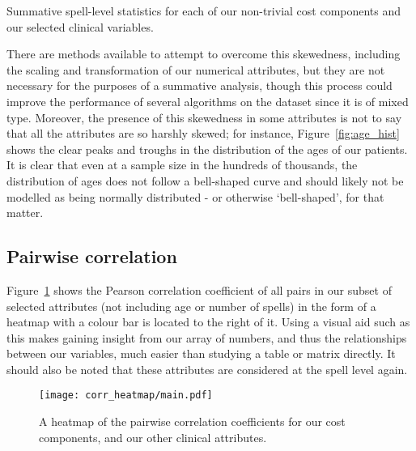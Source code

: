 \begin{table}[h!]
    \resizebox{\textwidth}{!}{%
        
    }
    \resizebox{\textwidth}{!}{%
        
    }
    \resizebox{\textwidth}{!}{%
        
    }
    \caption{Summative spell-level statistics for each of our non-trivial cost
    components and our selected clinical variables.}\label{tab:summative}
\end{table}

There are methods available to attempt to overcome this skewedness, including
the scaling and transformation of our numerical attributes, but they are not
necessary for the purposes of a summative analysis, though this process could
improve the performance of several algorithms on the dataset since it is of
mixed type. Moreover, the presence of this skewedness in some attributes is not
to say that all the attributes are so harshly skewed; for instance,
Figure~\ref{fig:age_hist} shows the clear peaks and troughs in the distribution
of the ages of our patients. It is clear that even at a sample size in the
hundreds of thousands, the distribution of ages does not follow a bell-shaped
curve and should likely not be modelled as being normally distributed \-- or
otherwise `bell-shaped', for that matter.

\subsection{Pairwise correlation}\label{subsec:corr}

Figure~\ref{fig:corr_heatmap} shows the Pearson correlation coefficient of all
pairs in our subset of selected attributes (not including age or number of
spells) in the form of a heatmap with a colour bar is located to the right of
it. Using a visual aid such as this makes gaining insight from our array of
numbers, and thus the relationships between our variables, much easier than
studying a table or matrix directly. It should also be noted that these
attributes are considered at the spell level again.

\begin{figure}[h!]
    \vspace{-50pt}%
    \texttt{[image: corr\_heatmap/main.pdf]}
    \caption{A heatmap of the pairwise correlation coefficients for our cost
    components, and our other clinical attributes.}\label{fig:corr_heatmap}
\end{figure}

